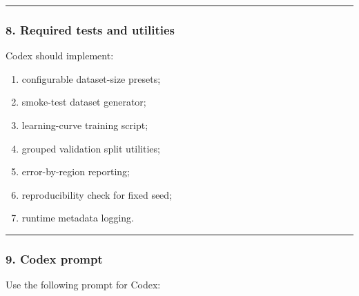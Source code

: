 \documentclass[
]{article}
\providecommand{\tightlist}{%
  \setlength{\itemsep}{0pt}\setlength{\parskip}{0pt}}
\begin{document}
\begin{center}\rule{0.5\linewidth}{0.5pt}\end{center}

\hypertarget{required-tests-and-utilities}{%
\subsubsection{8. Required tests and
utilities}\label{required-tests-and-utilities}}

Codex should implement:

\begin{enumerate}
\def\labelenumi{\arabic{enumi}.}
\tightlist
\item
  configurable dataset-size presets;
\item
  smoke-test dataset generator;
\item
  learning-curve training script;
\item
  grouped validation split utilities;
\item
  error-by-region reporting;
\item
  reproducibility check for fixed seed;
\item
  runtime metadata logging.
\end{enumerate}

\begin{center}\rule{0.5\linewidth}{0.5pt}\end{center}

\hypertarget{codex-prompt-3}{%
\subsubsection{9. Codex prompt}\label{codex-prompt-3}}

Use the following prompt for Codex:
\end{document}
